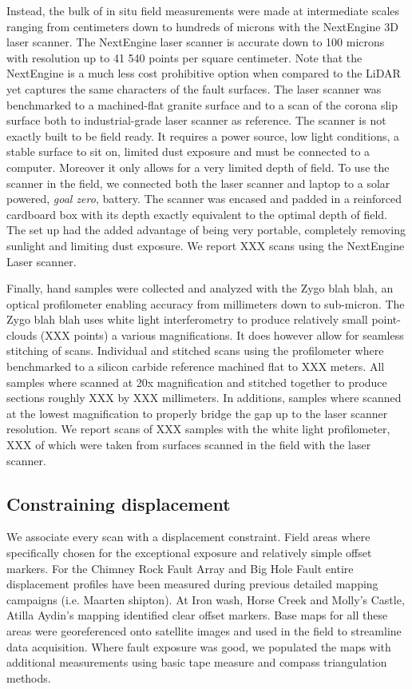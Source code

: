 \documentclass[12pt,a4paper]{article}
\begin{document}
Instead, the bulk of in situ field measurements were made at intermediate scales ranging from centimeters down to hundreds of microns with the NextEngine 3D laser scanner. The NextEngine laser scanner is accurate down to 100 microns with resolution up to 41 540 points per square centimeter. Note that the NextEngine is a much less cost prohibitive option when compared to the LiDAR yet captures the same characters of the fault surfaces. The laser scanner was benchmarked to a machined-flat granite surface and to a scan of the corona slip surface both to industrial-grade laser scanner as reference. The scanner is not exactly built to be field ready. It requires a power source, low light conditions, a stable surface to sit on, limited dust exposure and must be connected to a computer. Moreover it only allows for a very limited depth of field. To use the scanner in the field, we connected both the laser scanner and laptop to a solar powered, \textit{goal zero}, battery. The scanner was encased and padded in a reinforced cardboard box with its depth exactly equivalent to the optimal depth of field. The set up had the added advantage of being very portable, completely removing sunlight and limiting dust exposure. We report XXX scans using the NextEngine Laser scanner.

Finally, hand samples were collected and analyzed with the Zygo blah blah, an optical profilometer enabling accuracy from millimeters down to sub-micron. The Zygo blah blah uses white light interferometry to produce relatively small point-clouds (XXX points) a various magnifications. It does however allow for seamless stitching of scans. Individual and stitched scans using the profilometer where benchmarked to a silicon carbide reference machined flat to XXX meters. All samples where scanned at 20x magnification and stitched together to produce sections roughly XXX by XXX millimeters. In additions, samples where scanned at the lowest magnification to properly bridge the gap up to the laser scanner resolution. We report scans of XXX samples with the white light profilometer, XXX of which were taken from surfaces scanned in the field with the laser scanner.

\subsection{Constraining displacement}

We associate every scan with a displacement constraint. Field areas where specifically chosen for the exceptional exposure and relatively simple offset markers. For the Chimney Rock Fault Array and Big Hole Fault entire displacement profiles have been measured during previous detailed mapping campaigns (i.e. Maarten  shipton). At Iron wash, Horse Creek and Molly’s Castle, Atilla Aydin’s mapping identified clear offset markers. Base maps for all these areas were georeferenced onto satellite images and used in the field to streamline data acquisition. Where fault exposure was good, we populated the maps with additional measurements using basic tape measure and compass triangulation methods. 
\end{document}

